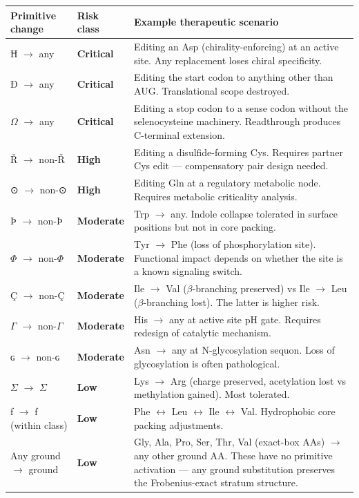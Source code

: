 \documentclass[12pt,a4paper]{article}
\begin{document}
\begin{table}[htbp]
\centering
\small
{}
\begin{tabularx}{\textwidth}{>{\centering\arraybackslash}X >{\centering\arraybackslash}X >{\centering\arraybackslash}X}
\toprule
\rowcolor{gray!25}\textbf{Primitive change} & \textbf{Risk class} & \textbf{Example therapeutic scenario} \\
\midrule
\rowcolors{1}{white}{gray!10}
Ħ $\rightarrow$ any & \textbf{Critical} & Editing an Asp (chirality-enforcing) at an active site. Any replacement loses chiral specificity. \\
Ð $\rightarrow$ any & \textbf{Critical} & Editing the start codon to anything other than AUG. Translational scope destroyed. \\
$\Omega$ $\rightarrow$ any & \textbf{Critical} & Editing a stop codon to a sense codon without the selenocysteine machinery. Readthrough produces C-terminal extension. \\
Ř $\rightarrow$ non-Ř & \textbf{High} & Editing a disulfide-forming Cys. Requires partner Cys edit --- compensatory pair design needed. \\
⊙ $\rightarrow$ non-⊙ & \textbf{High} & Editing Gln at a regulatory metabolic node. Requires metabolic criticality analysis. \\
Þ $\rightarrow$ non-Þ & \textbf{Moderate} & Trp $\rightarrow$ any. Indole collapse tolerated in surface positions but not in core packing. \\
$\Phi$ $\rightarrow$ non-$\Phi$ & \textbf{Moderate} & Tyr $\rightarrow$ Phe (loss of phosphorylation site). Functional impact depends on whether the site is a known signaling switch. \\
Ç $\rightarrow$ non-Ç & \textbf{Moderate} & Ile $\rightarrow$ Val ($\beta$-branching preserved) vs Ile $\rightarrow$ Leu ($\beta$-branching lost). The latter is higher risk. \\
$\Gamma$ $\rightarrow$ non-$\Gamma$ & \textbf{Moderate} & His $\rightarrow$ any at active site pH gate. Requires redesign of catalytic mechanism. \\
ɢ $\rightarrow$ non-ɢ & \textbf{Moderate} & Asn $\rightarrow$ any at N-glycosylation sequon. Loss of glycosylation is often pathological. \\
$\Sigma$ $\rightarrow$ $\Sigma$ & \textbf{Low} & Lys $\rightarrow$ Arg (charge preserved, acetylation lost vs methylation gained). Most tolerated. \\
ƒ $\rightarrow$ ƒ (within class) & \textbf{Low} & Phe $\leftrightarrow$ Leu $\leftrightarrow$ Ile $\leftrightarrow$ Val. Hydrophobic core packing adjustments. \\
Any ground $\rightarrow$ ground & \textbf{Low} & Gly, Ala, Pro, Ser, Thr, Val (exact-box AAs) $\rightarrow$ any other ground AA. These have no primitive activation --- any ground substitution preserves the Frobenius-exact stratum structure. \\
\bottomrule
\end{tabularx}
\end{table}
\end{document}
